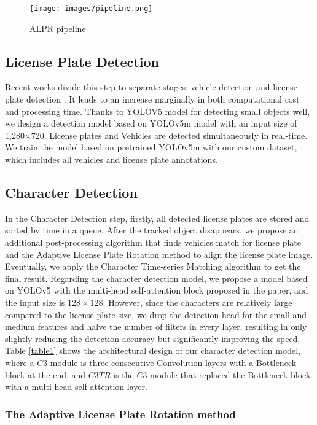\documentclass[conference]{IEEEtran}
\begin{document}
\begin{figure*}[t]
\centering
\texttt{[image: images/pipeline.png]}
\caption{ALPR pipeline}    
\label{ALPR pipeline}

\end{figure*}

\subsection{License Plate Detection}
Recent works divide this step to separate stages: vehicle detection and license plate detection \cite{ufpr, layout}. It leads to an increase marginally in both computational cost and processing time. Thanks to YOLOV5 model for detecting small objects well, we design a detection model based on YOLOv5m model with an input size of 1,280$\times$720. License plates and Vehicles are detected simultaneously in real-time. We train the model based on pretrained YOLOv5m with our custom dataset, which includes all vehicles and license plate annotations.


\subsection{Character Detection}

In the Character Detection step, firstly, all detected license plates are stored and sorted by time in a queue. After the tracked object disappears, we propose an additional post-processing algorithm that finds vehicles match for license plate and the Adaptive License Plate Rotation method to align the license plate image. Eventually, we apply the Character Time-series Matching algorithm to get the final result. Regarding the character detection model, we propose a model based on YOLOv5 with the multi-head self-attention block proposed in the paper\cite{attention}, and the input size is $128 \times 128$. However, since the characters are relatively large compared to the license plate size, we drop the detection head for the small and medium features and halve the number of filters in every layer, resulting in only slightly reducing the detection accuracy but significantly improving the speed. Table \ref{table1} shows the architectural design of our character detection model, where a $C3$ module is three consecutive Convolution layers with a Bottleneck block at the end, and $C3TR$ is the $C3$ module that replaced the Bottleneck block with a multi-head self-attention layer.

\subsubsection{The Adaptive License Plate Rotation method}
\end{document}
